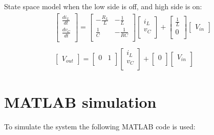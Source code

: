 \documentclass[]{article}
\begin{document}
State space model when the low side is off, and high side is on:
\begin{equation}
	\begin{array}{l}
		\begin{bmatrix}
			\frac{di_{L}}{dt} \\
			\frac{dv_{C}}{dt} \\
		\end{bmatrix}
		=
		\begin{bmatrix}
			-\frac{R_{L}}{L} & -\frac{1}{L} \\
			\frac{1}{C} & -\frac{1}{RC} \\	
		\end{bmatrix}
		\begin{bmatrix}
			i_{L} \\
			v_{C} \\
		\end{bmatrix}
		+
		\begin{bmatrix}
			\frac{1}{L} \\
			0 \\	
		\end{bmatrix}
		\begin{bmatrix}
			V_{in}
		\end{bmatrix} 
		\\
		\\
		\begin{bmatrix}
			V_{out}
		\end{bmatrix} 
		=
		\begin{bmatrix}
			0 & 1 \\
		\end{bmatrix}
		\begin{bmatrix}
			i_{L} \\
			v_{C} \\
		\end{bmatrix}
		+
		\begin{bmatrix}
			0 \\
		\end{bmatrix}
		\begin{bmatrix}
			V_{in} \\
		\end{bmatrix}
	\end{array}
\end{equation}

\newpage
\section{MATLAB simulation}
To simulate the system the following MATLAB code is used:
\end{document}
